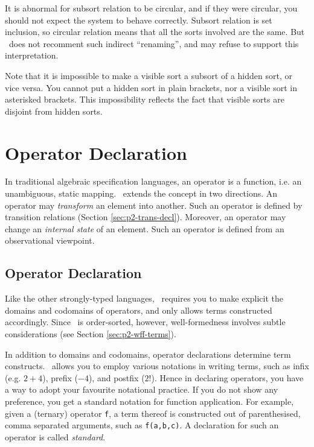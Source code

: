 \documentclass[a4paper]{memoir}
\begin{document}
It is abnormal for subsort relation to be circular, and if they were
circular, you should not expect the system to behave correctly.
Subsort relation is set inclusion, so circular relation
means that all the sorts involved are the same. But \cafeobj~does not
recomment such indirect ``renaming'', and may refuse to
support this interpretation.


Note that it is impossible to make a visible sort a subsort of
a hidden sort, or vice versa. You cannot put a hidden sort in
plain brackets, nor a visible sort in asterisked brackets.
This impossibility reflects the fact
that visible sorts are disjoint from hidden sorts.

\section{Operator Declaration}\label{sec:p2-operator}

In traditional algebraic specification languages, an operator
is a function, i.e. an unambiguous, static mapping.
\cafeobj~extends the concept in two directions.
An operator may {\em transform} an element into another.
Such an operator is defined by transition relations
(Section \ref{sec:p2-trans-decl}). Moreover, an operator
may change an {\em internal state} of an element. Such an
operator is defined from an observational viewpoint.

\subsection{Operator Declaration}\label{sec:p2-op-decl}

Like the other strongly-typed languages, \cafeobj~requires you to make
explicit the domains and
codomains of operators, and only allows terms constructed accordingly.
Since \cafeobj~is order-sorted, however, well-formedness involves
subtle considerations (see Section \ref{sec:p2-wff-terms}).

In addition to domains and codomains, operator declarations determine
term constructs.
\cafeobj~allows you to employ various notations in writing terms,
such as infix (e.g. $2 + 4$), prefix ($- 4$), and postfix ($2!$).
Hence in declaring operators, you have a way to adopt your favourite
notational practice. If you do not show any preference, you get
a standard notation for function application.
For example, given a (ternary) operator \verb|f|,
a term thereof is constructed out of parenthesised, comma separated
arguments, such as \verb|f(a,b,c)|.
A declaration for such an operator is called {\em standard}.
\end{document}
